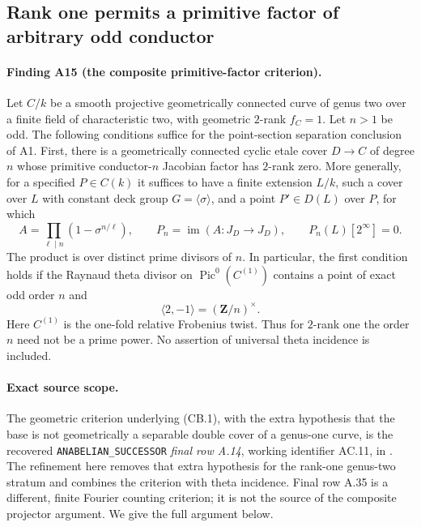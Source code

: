 \subsection{Rank one permits a primitive factor of arbitrary odd conductor}
\label{sec:rank-one-composite-bridge}

\paragraph{Finding A15 (the composite primitive-factor criterion).}
Let $C/k$ be a smooth projective geometrically connected curve of genus
two over a finite field of characteristic two, with geometric $2$-rank
$f_C=1$. Let $n>1$ be odd. The following conditions suffice for the
point-section separation conclusion of A1.
First, there is a geometrically connected cyclic etale cover
$D\to C$ of degree $n$ whose primitive conductor-$n$ Jacobian factor
has $2$-rank zero. More generally, for a specified $P\in C(k)$ it
suffices to have a finite extension $L/k$, such a cover over $L$ with
constant deck group $G=\langle\sigma\rangle$, and a point
$P'\in D(L)$ over $P$, for which
\[
 A=\prod_{\ell\mid n}(1-\sigma^{n/\ell}),\qquad
 P_n=\operatorname{im}(A:J_D\longrightarrow J_D),\qquad
 P_n(L)[2^\infty]=0.                                      \tag{CB.1}
\]
The product is over distinct prime divisors of $n$.
In particular, the first condition holds if the Raynaud theta divisor
on $\operatorname{Pic}^0(C^{(1)})$ contains a point of exact odd order
$n$ and
\[
                    \langle 2,-1\rangle=(\mathbf Z/n)^\times.
                                                               \tag{CB.2}
\]
Here $C^{(1)}$ is the one-fold relative Frobenius twist. Thus for
$2$-rank one the order $n$ need not be a prime power. No assertion of
universal theta incidence is included.

\paragraph{Exact source scope.}
The geometric criterion underlying (CB.1), with the extra hypothesis
that the base is not geometrically a separable double cover of a
genus-one curve, is the recovered \texttt{ANABELIAN\_SUCCESSOR}
\emph{final row A.14}, working identifier AC.11, in
. The refinement here
removes that extra hypothesis for the rank-one genus-two stratum and
combines the criterion with theta incidence. Final row A.35 is a
different, finite Fourier counting criterion; it is not the source of
the composite projector argument. We give the full argument below.

